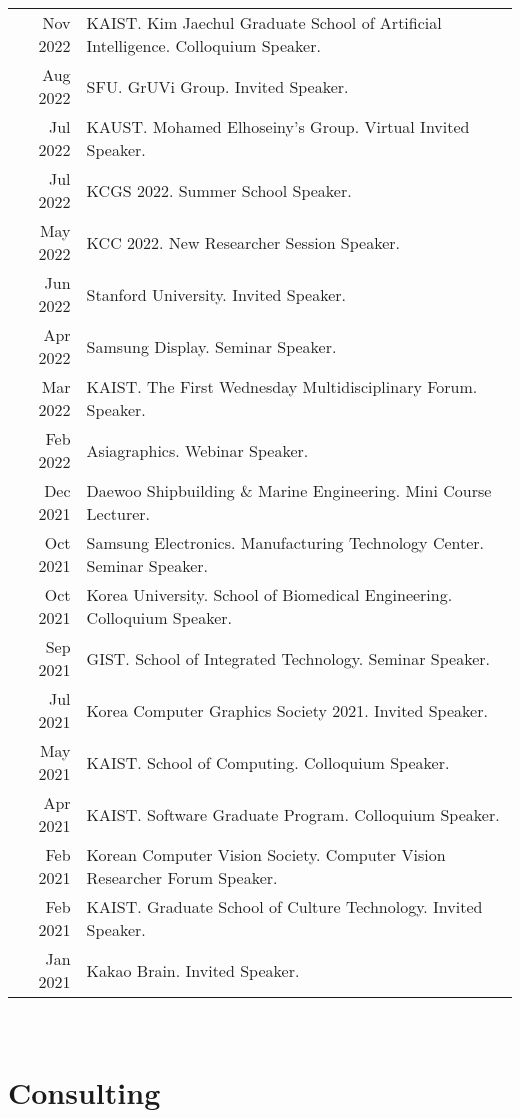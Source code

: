 \documentclass[letterpaper,10pt]{article} %
\newcommand{\blankline}{\quad\pagebreak[2]}
\begin{document}
{{\begin{tabular}{r|p{11cm}}
Nov 2022 & KAIST. Kim Jaechul Graduate School of Artificial Intelligence. Colloquium Speaker.\\
Aug 2022 & SFU. GrUVi Group. Invited Speaker.\\
Jul 2022 & KAUST. Mohamed Elhoseiny's Group. Virtual Invited Speaker.\\
Jul 2022 & KCGS 2022. Summer School Speaker. \\
May 2022 & KCC 2022. New Researcher Session Speaker.\\
Jun 2022 & Stanford University. Invited Speaker.\\
Apr 2022 & Samsung Display. Seminar Speaker.\\
Mar 2022 & KAIST. The First Wednesday Multidisciplinary Forum. Speaker.\\
Feb 2022 & Asiagraphics. Webinar Speaker.\\
Dec 2021 & Daewoo Shipbuilding \& Marine Engineering. Mini Course Lecturer.\\
Oct 2021 & Samsung Electronics. Manufacturing Technology Center. Seminar Speaker.\\
Oct 2021 & Korea University. School of Biomedical Engineering. Colloquium Speaker.\\
Sep 2021 & GIST. School of Integrated Technology. Seminar Speaker.\\
Jul 2021 & Korea Computer Graphics Society 2021. Invited Speaker.\\
May 2021 & KAIST. School of Computing. Colloquium Speaker.\\
Apr 2021 & KAIST. Software Graduate Program. Colloquium Speaker.\\
Feb 2021 & Korean Computer Vision Society. Computer Vision Researcher Forum Speaker.\\
Feb 2021 & KAIST. Graduate School of Culture Technology. Invited Speaker.\\
Jan 2021 & Kakao Brain. Invited Speaker.\\
\end{tabular}\\

\blankline



\section{Consulting}

}}
\end{document}
